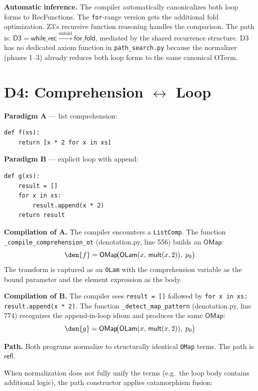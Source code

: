 \textbf{Automatic inference.}
The compiler automatically canonicalizes both loop forms to
RecFunctions.  The \texttt{for}-range version gets the additional
fold optimization.  Z3's recursive function reasoning handles the
comparison.  The path is:
$\mathsf{D3} = \mathsf{while\_rec} \xrightarrow{\text{unfold}} 
\mathsf{for\_fold}$, mediated by the shared recurrence structure.
D3 has no dedicated axiom function in \texttt{path\_search.py}
because the normalizer (phases 1--3) already reduces both loop
forms to the same canonical OTerm.


\section{D4: Comprehension $\leftrightarrow$ Loop}
\label{sec:d4}

\textbf{Paradigm A} --- list comprehension:
\begin{lstlisting}
def f(xs):
    return [x * 2 for x in xs]
\end{lstlisting}

\textbf{Paradigm B} --- explicit loop with append:
\begin{lstlisting}
def g(xs):
    result = []
    for x in xs:
        result.append(x * 2)
    return result
\end{lstlisting}

\textbf{Compilation of A.}
The compiler encounters a \texttt{ListComp}.  The function
\texttt{\_compile\_comprehension\_ot} (denotation.py, line 556)
builds an $\mathsf{OMap}$:
\[
  \den{f} = \mathsf{OMap}\!\big(
    \mathsf{OLam}(x,\, \mathsf{mult}(x, 2)),\; p_0\big)
\]
The transform is captured as an \texttt{OLam} with the comprehension
variable as the bound parameter and the element expression as the
body.

\textbf{Compilation of B.}
The compiler sees \texttt{result = []} followed by
\texttt{for x in xs: result.append(x * 2)}.  The function
\texttt{\_detect\_map\_pattern} (denotation.py, line 774) recognizes
the append-in-loop idiom and produces the same $\mathsf{OMap}$:
\[
  \den{g} = \mathsf{OMap}\!\big(
    \mathsf{OLam}(x,\, \mathsf{mult}(x, 2)),\; p_0\big)
\]

\textbf{Path.}
Both programs normalize to structurally identical \texttt{OMap} terms.
The path is $\mathsf{refl}$.

When normalization does not fully unify the terms (e.g.\ the loop
body contains additional logic), the path constructor applies
catamorphism fusion:

